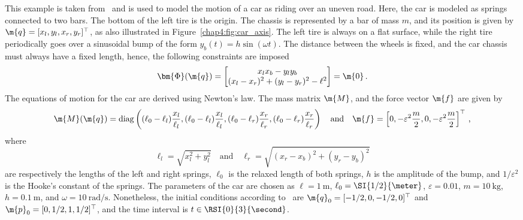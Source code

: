 This example is taken from~\cite{lioen1998test, mazzia2008test} and is used to model the motion of a car as riding over an uneven road. Here, the car is modeled as springs connected to two bars. The bottom of the left tire is the origin. The chassis is represented by a bar of mass $m$, and its position is given by $\m{q} = [x_l, y_l, x_r, y_r]^\top$, as also illustrated in Figure~\ref{chap4:fig:car_axis}. The left tire is always on a flat surface, while the right tire periodically goes over a sinusoidal bump of the form $y_b(t) = h\sin(\omega t)$. The distance between the wheels is fixed, and the car chassis must always have a fixed length, hence, the following constraints are imposed
%
\begin{equation*}
  \bm{\Phi}(\m{q}) = \begin{bmatrix}
    x_l x_b - y_l y_b \\
    (x_l - x_r)^2 + (y_l - y_r)^2 - \ell^2
  \end{bmatrix} = \m{0} \, \text{.}
\end{equation*}
%
The equations of motion for the car are derived using Newton's law. The mass matrix $\m{M}$, and the force vector $\m{f}$ are given by
%
\begin{equation*}
  \m{M}(\m{q}) = \mathrm{diag}\left(
    (\ell_0-\ell_l)\dfrac{x_l}{\ell_l},
    (\ell_0-\ell_l)\dfrac{x_l}{\ell_l},
    (\ell_0-\ell_r)\dfrac{x_r}{\ell_r},
    (\ell_0-\ell_r)\dfrac{x_r}{\ell_r}
  \right)
  \quad \text{and} \quad
  \m{f} = \left[
    0, -\varepsilon^2\dfrac{m}{2},
    0, -\varepsilon^2\dfrac{m}{2}
  \right]^{\top}
  \, \text{,}
\end{equation*}
%
where
%
\begin{equation*}
  \ell_l = \sqrt{x_l^2 + y_l^2}
  \quad \text{and} \quad
  \ell_r = \sqrt{(x_r - x_b)^2 + (y_r - y_b)^2}
\end{equation*}
%
are respectively the lengths of the left and right springs, $\ell_0$ is the relaxed length of both springs, $h$ is the amplitude of the bump, and $1/\varepsilon^2$ is the Hooke's constant of the springs. The parameters of the car are chosen as $\ell = \SI{1}{\meter}$, $\ell_0 = \SI{1/2}{\meter}$, $\varepsilon = 0.01$, $m = \SI{10}{\kilo\gram}$, $h = \SI{0.1}{\meter}$, and $\omega = \SI{10}{\radian\per\second}$. Nonetheless, the initial conditions according to~\cite{lioen1998test, mazzia2008test} are $\m{q}_0 = [-1/2, 0, -1/2, 0]^\top$ and $\m{p}_0 = [0, 1/2, 1, 1/2]^\top$, and the time interval is $t \in \RSI{0}{3}{\second}$.

